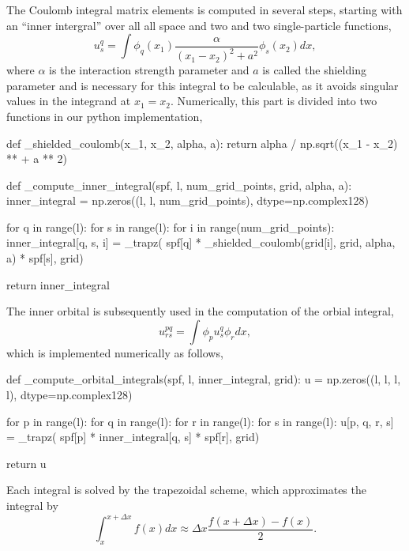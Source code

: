 The Coulomb integral matrix elements is computed in
several steps, starting with an ``inner intergral'' over all all space 
and two and two single-particle functions,
\begin{equation}
   u^q_s = \int \phi_q(x_1) \frac{\alpha}{(x_1-x_2)^2 + a^2}  \phi_s(x_2) dx,
\end{equation}
where $\alpha$ is the interaction strength parameter and $a$ is called the shielding 
parameter and is necessary for this integral 
to be calculable, as it avoids singular values in the integrand at $x_1=x_2$.
Numerically, this part is divided into two functions in our python implementation,
\begin{python}
def _shielded_coulomb(x_1, x_2, alpha, a):
    return alpha / np.sqrt((x_1 - x_2) ** + a ** 2)

def _compute_inner_integral(spf, l, num_grid_points, grid, alpha, a):
    inner_integral = np.zeros((l, l, num_grid_points), dtype=np.complex128)

    for q in range(l):
        for s in range(l):
            for i in range(num_grid_points):
                inner_integral[q, s, i] = _trapz(
                    spf[q]
                    * _shielded_coulomb(grid[i], grid, alpha, a)
                    * spf[s],
                    grid)

    return inner_integral
\end{python}

The inner orbital is subsequently used in the computation of the orbial integral,
\begin{equation}
    u^{pq}_{rs} = \int \phi_p u^q_s \phi_r dx,
\end{equation}
which is implemented numerically as follows,
\begin{python}
def _compute_orbital_integrals(spf, l, inner_integral, grid):
    u = np.zeros((l, l, l, l), dtype=np.complex128)

    for p in range(l):
        for q in range(l):
            for r in range(l):
                for s in range(l):
                    u[p, q, r, s] = _trapz(
                        spf[p] * inner_integral[q, s] * spf[r], grid)

    return u
\end{python}
Each integral is solved by the trapezoidal scheme, which approximates the integral 
by 
\begin{equation}
    \int_x^{x + \Delta x} f(x) dx \approx \Delta x \frac{f(x + \Delta x) - f(x)}{2}.
\end{equation}

